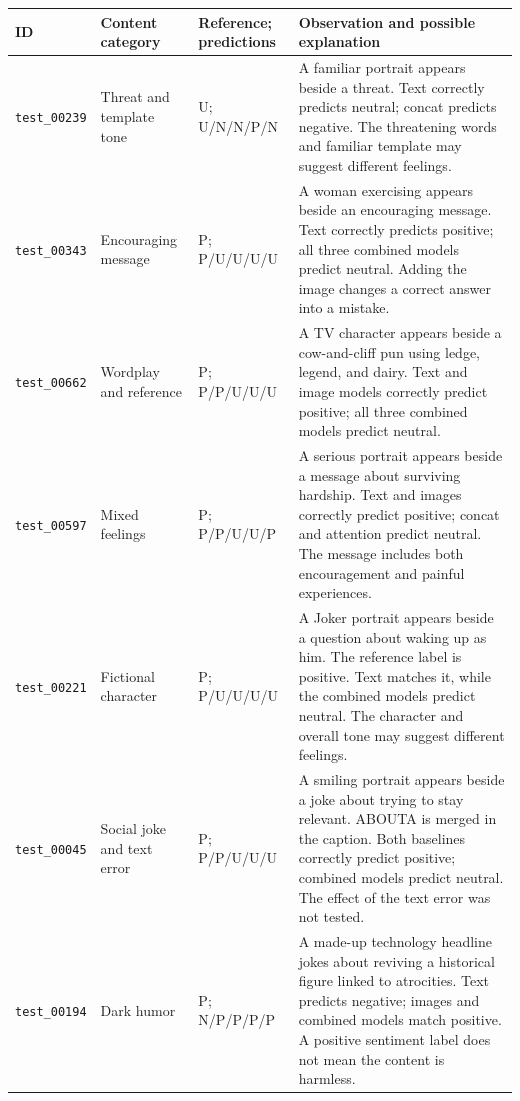 \documentclass[11pt,a4paper]{article}
\begin{document}
\setlength{\tabcolsep}{4pt}
\small
\clearpage
\begin{table}[p]
\centering\small
\begin{tabular}{>{\raggedright\arraybackslash}p{1.95cm}>{\raggedright\arraybackslash}p{2.30cm}>{\raggedright\arraybackslash}p{2.1cm}>{\raggedright\arraybackslash}p{7.1cm}}
\toprule
ID & Content category & Reference; predictions & Observation and possible explanation \\
\midrule
\texttt{test\_00239} & Threat and template tone & U; U/N/N/P/N & A familiar portrait appears beside a threat. Text correctly predicts neutral; concat predicts negative. The threatening words and familiar template may suggest different feelings. \\[4pt]
\texttt{test\_00343} & Encouraging message & P; P/U/U/U/U & A woman exercising appears beside an encouraging message. Text correctly predicts positive; all three combined models predict neutral. Adding the image changes a correct answer into a mistake. \\[4pt]
\texttt{test\_00662} & Wordplay and reference & P; P/P/U/U/U & A TV character appears beside a cow-and-cliff pun using ledge, legend, and dairy. Text and image models correctly predict positive; all three combined models predict neutral. \\[4pt]
\texttt{test\_00597} & Mixed feelings & P; P/P/U/U/P & A serious portrait appears beside a message about surviving hardship. Text and images correctly predict positive; concat and attention predict neutral. The message includes both encouragement and painful experiences. \\[4pt]
\texttt{test\_00221} & Fictional character & P; P/U/U/U/U & A Joker portrait appears beside a question about waking up as him. The reference label is positive. Text matches it, while the combined models predict neutral. The character and overall tone may suggest different feelings. \\[4pt]
\texttt{test\_00045} & Social joke and text error & P; P/P/U/U/U & A smiling portrait appears beside a joke about trying to stay relevant. ABOUTA is merged in the caption. Both baselines correctly predict positive; combined models predict neutral. The effect of the text error was not tested. \\[4pt]
\texttt{test\_00194} & Dark humor & P; N/P/P/P/P & A made-up technology headline jokes about reviving a historical figure linked to atrocities. Text predicts negative; images and combined models match positive. A positive sentiment label does not mean the content is harmless. \\[4pt]

\end{tabular}
\end{table}
\end{document}
